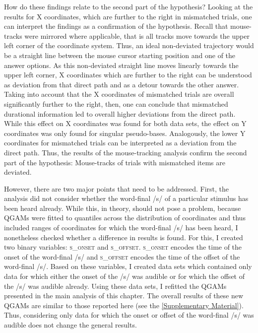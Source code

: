 How do these findings relate to the second part of the hypothesis? Looking at the results for X coordinates, which are further to the right in mismatched trials, one can interpret the findings as a confirmation of the hypothesis. Recall that mouse-tracks were mirrored where applicable, that is all tracks move towards the upper left corner of the coordinate system. Thus, an ideal non-deviated trajectory would be a straight line between the mouse cursor starting position and one of the answer options. As this non-deviated straight line moves linearly towards the upper left corner, X coordinates which are further to the right can be understood as deviation from that direct path and as a detour towards the other answer. Taking into account that the X coordinates of mismatched trials are overall significantly further to the right, then, one can conclude that mismatched durational information led to overall higher deviations from the direct path. While this effect on X coordinates was found for both data sets, the effect on Y coordinates was only found for singular pseudo-bases. Analogously, the lower Y coordinates for mismatched trials can be interpreted as a deviation from the direct path. Thus, the results of the mouse-tracking analysis confirm the second part of the hypothesis: Mouse-tracks of trials with mismatched items are deviated.

However, there are two major points that need to be addressed. First, the analysis did not consider whether the word-final /s/ of a particular stimulus has been heard already. While this, in theory, should not pose a problem, because QGAMs were fitted to quantiles across the distribution of coordinates and thus included ranges of coordinates for which the word-final /s/ has been heard, I nonetheless checked whether a difference in results is found. For this, I created two binary variables: \textsc{s\_onset} and \textsc{s\_offset}. \textsc{s\_onset} encodes the time of the onset of the word-final /s/ and \textsc{s\_offset} encodes the time of the offset of the word-final /s/. Based on these variables, I created data sets which contained only data for which either the onset of the /s/ was audible or for which the offset of the /s/ was audible already. Using these data sets, I refitted the QGAMs presented in the main analysis of this chapter. The overall results of these new QGAMs are similar to those reported here (see the \ref{Supplementary Material}). Thus, considering only data for which the onset or offset of the word-final /s/ was audible does not change the general results.

